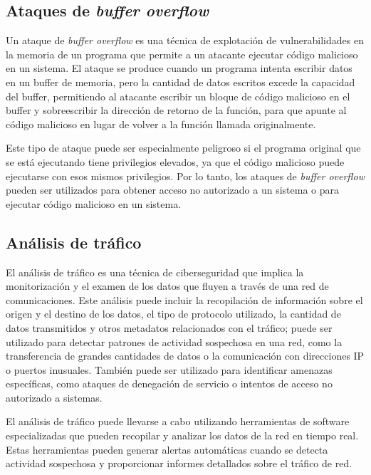         
        \subsection{Ataques de \textit{buffer overflow}}
            
            Un ataque de \textit{buffer overflow} es una técnica de explotación de vulnerabilidades en la memoria de un programa que permite a un atacante ejecutar código malicioso en un sistema. El ataque se produce cuando un programa intenta escribir datos en un buffer de memoria, pero la cantidad de datos escritos excede la capacidad del buffer, permitiendo al atacante escribir un bloque de código malicioso en el buffer y sobreescribir la dirección de retorno de la función, para que apunte al código malicioso en lugar de volver a la función llamada originalmente.
            
            Este tipo de ataque puede ser especialmente peligroso si el programa original que se está ejecutando tiene privilegios elevados, ya que el código malicioso puede ejecutarse con esos mismos privilegios. Por lo tanto, los ataques de \textit{buffer overflow} pueden ser utilizados para obtener acceso no autorizado a un sistema o para ejecutar código malicioso en un sistema.
        
        
        \subsection{Análisis de tráfico}
            
            El análisis de tráfico es una técnica de ciberseguridad que implica la monitorización y el examen de los datos que fluyen a través de una red de comunicaciones. Este análisis puede incluir la recopilación de información sobre el origen y el destino de los datos, el tipo de protocolo utilizado, la cantidad de datos transmitidos y otros metadatos relacionados con el tráfico; puede ser utilizado para detectar patrones de actividad sospechosa en una red, como la transferencia de grandes cantidades de datos o la comunicación con direcciones IP o puertos inusuales. También puede ser utilizado para identificar amenazas específicas, como ataques de denegación de servicio o intentos de acceso no autorizado a sistemas.
            
            El análisis de tráfico puede llevarse a cabo utilizando herramientas de software especializadas que pueden recopilar y analizar los datos de la red en tiempo real. Estas herramientas pueden generar alertas automáticas cuando se detecta actividad sospechosa y proporcionar informes detallados sobre el tráfico de red.
            
